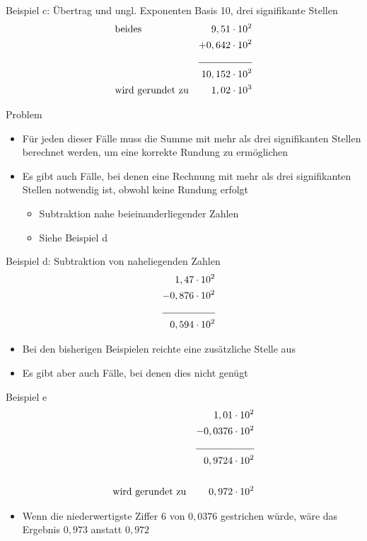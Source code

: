 \documentclass[12pt%
,xcolor=table
,aspectratio=169%
]{beamer}
\begin{document}
\begin{frame}{Beispiel c: Übertrag und ungl. Exponenten}
Basis 10, drei signifikante Stellen
\begin{align*}
	& \text{beides} & 9,51 & \cdot 10^2 \\
	& 				&  +0,642 & \cdot 10^2 \\ \cline{3-4}
	&				& 10,152 & \cdot 10^2 \\
	& \text{wird gerundet zu} & 1,02 & \cdot 10^3
\end{align*}
\end{frame}

\begin{frame}{Problem}
\begin{itemize}
	\item Für jeden dieser Fälle muss die Summe mit mehr als drei signifikanten Stellen berechnet werden, um eine korrekte Rundung zu ermöglichen
	\item Es gibt auch Fälle, bei denen eine Rechnung mit mehr als drei signifikanten Stellen notwendig ist, obwohl keine Rundung erfolgt 
	\begin{itemize}
		\item Subtraktion nahe beieinanderliegender Zahlen
		\item Siehe Beispiel d
	\end{itemize}		
\end{itemize}
\end{frame}

\begin{frame}{Beispiel d: Subtraktion von naheliegenden Zahlen}
\begin{align*}
& & 1,47 & \cdot 10^2 \\
& &-0,876 & \cdot 10^2 \\ \cline{3-4}
& & 0,594 & \cdot 10^2
\end{align*}
\begin{itemize}
	\item Bei den bisherigen Beispielen reichte eine zusätzliche Stelle aus
	\item Es gibt aber auch Fälle, bei denen dies nicht genügt
\end{itemize}
\end{frame}

\begin{frame}{Beispiel e}
\begin{align*}
& & 1,01 & \cdot 10^2 \\
& & -0,0376 & \cdot 10^2 \\ \cline{3-4}
& & 0,9724 & \cdot 10^2 \\
& & & \\
& \text{wird gerundet zu} & 0,972 & \cdot 10^2
\end{align*}
\begin{itemize}
	\item Wenn die niederwertigste Ziffer $6$ von $0,0376$ gestrichen würde, wäre das Ergebnis $0,973$ anstatt $0,972$
\end{itemize}
\end{frame}
\end{document}
